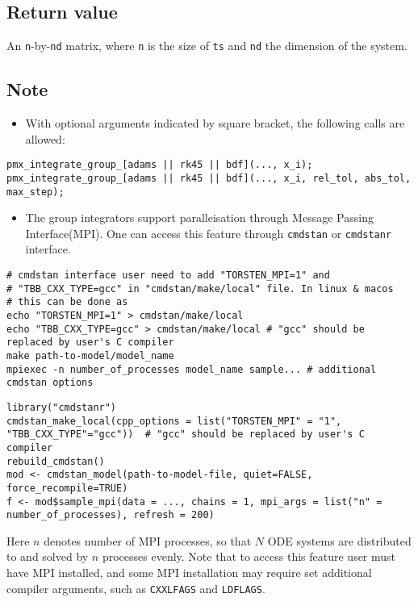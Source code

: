 \documentclass[12pt, reqno, oneside]{amsbook}
\numberwithin{equation}{chapter}
\numberwithin{figure}{chapter}
\numberwithin{table}{chapter}
\theoremstyle{remark}
\begin{document}
\subsection{Return value}
\label{sec:org6c2ec3c}
An \texttt{n}-by-\texttt{nd} matrix, where \texttt{n} is the size of \texttt{ts}
and \texttt{nd} the dimension of the system.
\subsection{Note}
\label{sec:org076898c}
\begin{itemize}
\item With optional arguments indicated by square bracket, the following calls are allowed:
\end{itemize}
\begin{verbatim}
pmx_integrate_group_[adams || rk45 || bdf](..., x_i);
pmx_integrate_group_[adams || rk45 || bdf](..., x_i, rel_tol, abs_tol, max_step);
\end{verbatim}
\begin{itemize}
\item The group integrators support paralleisation through Message Passing
Interface(MPI). One can access this feature through \texttt{cmdstan} or
\texttt{cmdstanr} interface.
\end{itemize}
\begin{verbatim}
# cmdstan interface user need to add "TORSTEN_MPI=1" and
# "TBB_CXX_TYPE=gcc" in "cmdstan/make/local" file. In linux & macos
# this can be done as
echo "TORSTEN_MPI=1" > cmdstan/make/local
echo "TBB_CXX_TYPE=gcc" > cmdstan/make/local # "gcc" should be replaced by user's C compiler
make path-to-model/model_name
mpiexec -n number_of_processes model_name sample... # additional cmdstan options
\end{verbatim}
\begin{verbatim}
library("cmdstanr")
cmdstan_make_local(cpp_options = list("TORSTEN_MPI" = "1", "TBB_CXX_TYPE"="gcc"))  # "gcc" should be replaced by user's C compiler
rebuild_cmdstan()
mod <- cmdstan_model(path-to-model-file, quiet=FALSE, force_recompile=TRUE)
f <- mod$sample_mpi(data = ..., chains = 1, mpi_args = list("n" = number_of_processes), refresh = 200)
\end{verbatim}
Here \(n\) denotes number of MPI processes, so that \(N\)
ODE systems are distributed to and solved by \(n\)
processes evenly. Note that to access this feature user must have
MPI installed, and some MPI installation may require set additional
compiler arguments, such as \texttt{CXXLFAGS} and \texttt{LDFLAGS}.
\end{document}
